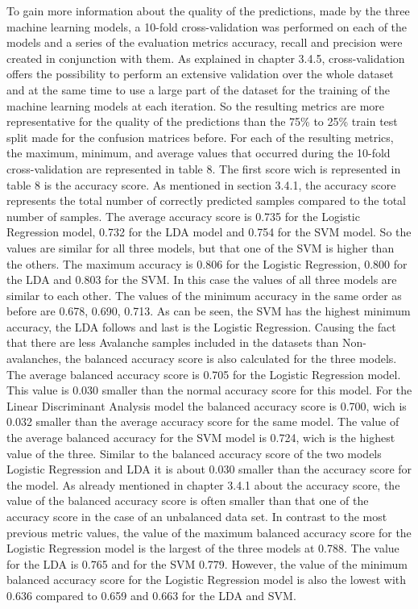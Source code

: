 \documentclass[../masterarbeit.tex]{subfiles}
\begin{document}
To gain more information about the quality of the predictions, made by the three machine learning models, a 10-fold cross-validation was performed on each of the models and a series of the evaluation metrics accuracy, recall and precision were created in conjunction with them. As explained in chapter 3.4.5, cross-validation offers the possibility to perform an extensive validation over the whole dataset and at the same time to use a large part of the dataset for the training of the machine learning models at each iteration. So the resulting metrics are more representative for the quality of the predictions than the 75\% to 25\% train test split made for the confusion matrices before. For each of the resulting metrics, the maximum, minimum, and average values that occurred during the 10-fold cross-validation are represented in table 8. The first score wich is represented in table 8 is the accuracy score. As mentioned in section 3.4.1, the accuracy score represents the total number of correctly predicted samples compared to the total number of samples. The average accuracy score is 0.735 for the Logistic Regression model, 0.732 for the LDA model and 0.754 for the SVM model. So the values are similar for all three models, but that one of the SVM is higher than the others. The maximum accuracy is 0.806 for the Logistic Regression, 0.800 for the LDA and 0.803 for the SVM. In this case the values of all three models are similar to each other. The values of the minimum accuracy in the same order as before are 0.678, 0.690, 0.713. As can be seen, the SVM has the highest minimum accuracy, the LDA follows and last is the Logistic Regression. Causing the fact that there are less Avalanche samples included in the datasets than Non-avalanches, the balanced accuracy score is also calculated for the three models. The average balanced accuracy score is 0.705 for the Logistic Regression model. This value is 0.030 smaller than the normal accuracy score for this model. For the Linear Discriminant Analysis model the balanced accuracy score is 0.700, wich is 0.032 smaller than the average accuracy score for the same model. The value of the average balanced accuracy for the SVM model is 0.724, wich is the highest value of the three. Similar to the balanced accuracy score of the two models Logistic Regression and LDA it is about 0.030 smaller than the accuracy score for the model. As already mentioned in chapter 3.4.1 about the accuracy score, the value of the balanced accuracy score is often smaller than that one of the accuracy score in the case of an unbalanced data set. In contrast to the most previous metric values, the value of the maximum balanced accuracy score for the Logistic Regression model is the largest of the three models at 0.788. The value for the LDA is 0.765 and for the SVM 0.779. However, the value of the minimum balanced accuracy score for the Logistic Regression model is also the lowest with 0.636 compared to 0.659 and 0.663 for the LDA and SVM. \\~\\
\end{document}
